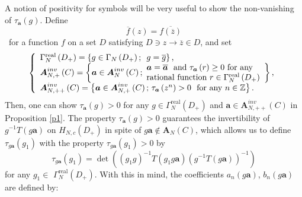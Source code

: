 \documentclass[a4paper]{article}%
\begin{document}
A notion of positivity for symbols will be very useful to show the
non-vanishing of $\tau_{\boldsymbol{a}}\left(  g\right)  $. Define%
\[
\overline{f}\left(  z\right)  =\overline{f\left(  \overline{z}\right)  }%
\]
\ for a function $f$ on a set $D$ satisfying $D\ni z\rightarrow\overline{z}\in
D$, and set
\begin{equation}
\left\{
\begin{array}
[c]{l}%
\Gamma_{N}^{\operatorname{real}}\left(  D_{+}\right)  =\left\{  g\in\Gamma
_{N}\left(  D_{+}\right)  \text{; \ }g=\overline{g}\right\}  \text{,}\\
\boldsymbol{A}_{N,+}^{inv}\left(  C\right)  =\left\{  \boldsymbol{a}%
\in\boldsymbol{A}_{N}^{inv}\left(  C\right)  \text{;}%
\begin{array}
[c]{l}%
\boldsymbol{a}=\overline{\boldsymbol{a}}\text{ \ and }\tau_{\boldsymbol{a}%
}\left(  r\right)  \geq0\text{ for any}\\
\text{rational function }r\in\Gamma_{N}^{\operatorname{real}}\left(
D_{+}\right)
\end{array}
\right\}  \text{,}\\
\boldsymbol{A}_{N,++}^{inv}\left(  C\right)  =\left\{  \boldsymbol{a}%
\in\boldsymbol{A}_{N,+}^{inv}\left(  C\right)  \text{; }\tau_{\boldsymbol{a}%
}\left(  z^{n}\right)  >0\text{ \ for any }n\in\mathbb{Z}\right\}  \text{.}%
\end{array}
\right.  \label{1-12}%
\end{equation}
Then, one can show $\tau_{\boldsymbol{a}}\left(  g\right)  >0$ for any
$g\in\Gamma_{N}^{\operatorname{real}}\left(  D_{+}\right)  $ and
$\boldsymbol{a}\in\boldsymbol{A}_{N,++}^{inv}\left(  C\right)  $ in
Proposition \ref{p1}. The property $\tau_{\boldsymbol{a}}\left(  g\right)  >0$
guarantees the invertibility of $g^{-1}T\left(  g\boldsymbol{a}\right)  $ on
$H_{N,c}\left(  D_{+}\right)  $ in spite of $g\boldsymbol{a}\notin
\boldsymbol{A}_{N}\left(  C\right)  $, which allows us to define
$\tau_{g\boldsymbol{a}}\left(  g_{1}\right)  $ with the property
$\tau_{g\boldsymbol{a}}\left(  g_{1}\right)  >0$ by%
\[
\tau_{g\boldsymbol{a}}\left(  g_{1}\right)  =\det\left(  \left(
g_{1}g\right)  ^{-1}T\left(  g_{1}g\boldsymbol{a}\right)  \left(
g^{-1}T\left(  g\boldsymbol{a}\right)  \right)  ^{-1}\right)
\]
for any $g_{1}\in$ $\Gamma_{N}^{\operatorname{real}}\left(  D_{+}\right)  $.
With this in mind, the coefficients $a_{n}\left(  g\boldsymbol{a}\right)  $,
$b_{n}\left(  g\boldsymbol{a}\right)  $ are defined by:%
\end{document}
